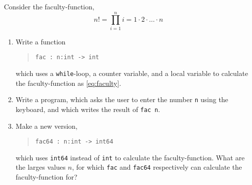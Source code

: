 Consider the faculty-function,
\begin{equation}
  n! = \prod_{i=1}^n i = 1\cdot 2\cdot \ldots \cdot n
  \label{eq:faculty}
\end{equation}
\begin{enumerate}
\item Write a function
  \begin{quote}
    \mbox{\lstinline!fac : n:int -> int!}
  \end{quote}
  which uses a \lstinline!while!-loop, a counter variable, and a local
  variable to calculate the faculty-function as \eqref{eq:faculty}.
  \item Write a program, which asks the user to enter the number
    \lstinline!n! using the keyboard, and which writes the result of \lstinline!fac n!.
  \item Make a new version, 
    \begin{quote}
      \mbox{\lstinline!fac64 : n:int -> int64!}
    \end{quote}
    which uses \lstinline{int64} instead of \lstinline{int} to
    calculate the faculty-function. What are the larges values $n$,
    for which \lstinline{fac} and \lstinline{fac64} respectively can
    calculate the faculty-function for?
  \end{enumerate}
